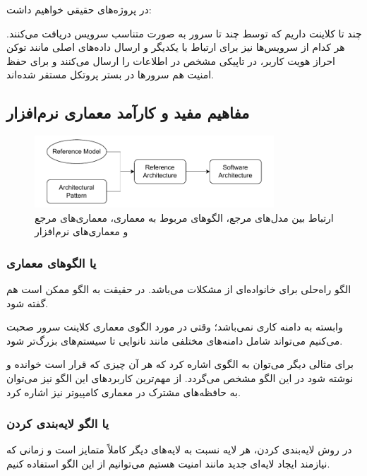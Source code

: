 در پروژه‌های حقیقی خواهیم داشت:

چند تا کلاینت داریم که توسط چند تا سرور به صورت متناسب سرویس دریافت می‌کنند. هر
کدام از سرویس‌ها نیز برای ارتباط با یکدیگر و ارسال داده‌های اصلی مانند توکن
احراز هویت کاربر، در تاپیکی مشخص در  اطلاعات را ارسال می‌کنند و برای
حفظ امنیت هم سرور‌ها در بستر پروتکل  مستقر شده‌اند.

\subsection{مفاهیم مفید و کارآمد معماری نرم‌افزار}

\begin{figure}[H]
    \centering
    \includegraphics[width=0.8\textwidth]{images/box_and_arrow_sa.drawio.pdf}
    \caption{ارتباط بین مدل‌های مرجع، الگو‌های مربوط به معماری، معماری‌های مرجع
    و معماری‌های نرم‌افزار}
    \label{fig:saStages}
\end{figure}

\subsubsection{ یا الگو‌های معماری}

الگو راه‌حلی برای خانواده‌ای از مشکلات می‌باشد. در حقیقت به الگو ممکن است
 هم گفته شود.

وابسته به دامنه کاری نمی‌باشد؛ وقتی در مورد الگوی معماری کلاینت سرور صحبت
می‌کنیم می‌تواند شامل دامنه‌های مختلفی مانند نانوایی تا سیستم‌های بزرگ‌تر شود.

برای مثالی دیگر می‌توان به الگوی  اشاره کرد که هر آن چیزی که
قرار است خوانده و نوشته شود در این الگو مشخص می‌گردد. از مهم‌ترین کاربرد‌های این
الگو نیز می‌توان به حافظه‌های مشترک در معماری کامپیوتر نیز اشاره کرد.

\subsubsection{ یا الگو لایه‌بندی کردن}

در روش لایه‌بندی کردن، هر لایه نسبت به لایه‌های دیگر کاملاً متمایز است و زمانی
که نیازمند ایجاد لایه‌ای جدید مانند امنیت هستیم می‌توانیم از این الگو استفاده
کنیم.

